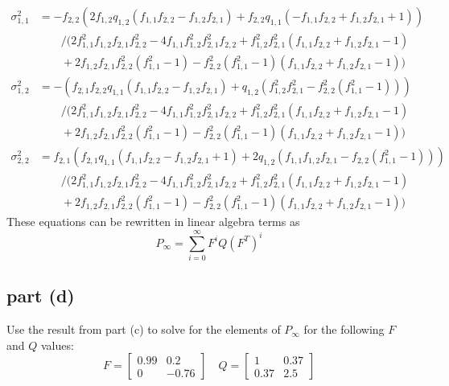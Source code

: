 \documentclass[11pt]{article}
\begin{document}
\begin{align*}
	\sigma_{1,1}^2 &= -f_{2,2}(2f_{1,2}q_{1,2}(f_{1,1}f_{2,2} - f_{1,2}f_{2,1}) + f_{2,2}q_{1,1}(-f_{1,1}f_{2,2} + f_{1,2}f_{2,1} + 1)) \\
	&\qquad /(2f_{1,1}^2f_{1,2}f_{2,1}f_{2,2}^2 - 4f_{1,1}f_{1,2}^2f_{2,1}^2f_{2,2} + f_{1,2}^2f_{2,1}^2(f_{1,1}f_{2,2} + f_{1,2}f_{2,1} - 1) \\
	&\qquad + 2f_{1,2}f_{2,1}f_{2,2}^2(f_{1,1}^2 - 1) - f_{2,2}^2(f_{1,1}^2 - 1)(f_{1,1}f_{2,2} + f_{1,2}f_{2,1} - 1)) \\
	\sigma_{1,2}^2 &= -(f_{2,1}f_{2,2}q_{1,1}(f_{1,1}f_{2,2} - f_{1,2}f_{2,1}) + q_{1,2}(f_{1,2}^2f_{2,1}^2 - f_{2,2}^2(f_{1,1}^2 - 1))) \\
	&\qquad /(2f_{1,1}^2f_{1,2}f_{2,1}f_{2,2}^2 - 4f_{1,1}f_{1,2}^2f_{2,1}^2f_{2,2} + f_{1,2}^2f_{2,1}^2(f_{1,1}f_{2,2} + f_{1,2}f_{2,1} - 1) \\
	&\qquad+ 2f_{1,2}f_{2,1}f_{2,2}^2(f_{1,1}^2 - 1) - f_{2,2}^2(f_{1,1}^2 - 1)(f_{1,1}f_{2,2} + f_{1,2}f_{2,1} - 1)) \\
	\sigma_{2,2}^2 &= f_{2,1}(f_{2,1}q_{1,1}(f_{1,1}f_{2,2} - f_{1,2}f_{2,1} + 1) + 2q_{1,2}(f_{1,1}f_{1,2}f_{2,1} - f_{2,2}(f_{1,1}^2 - 1))) \\
	&\qquad /(2f_{1,1}^2f_{1,2}f_{2,1}f_{2,2}^2 - 4f_{1,1}f_{1,2}^2f_{2,1}^2f_{2,2} + f_{1,2}^2f_{2,1}^2(f_{1,1}f_{2,2} + f_{1,2}f_{2,1} - 1) \\
	&\qquad+ 2f_{1,2}f_{2,1}f_{2,2}^2(f_{1,1}^2 - 1) - f_{2,2}^2(f_{1,1}^2 - 1)(f_{1,1}f_{2,2} + f_{1,2}f_{2,1} - 1))
\end{align*}
These equations can be rewritten in linear algebra terms as
\begin{equation*}
	P_\infty = \sum_{i=0}^\infty F^iQ(F^T)^i
\end{equation*}

\subsection*{part (d)}
Use the result from part (c) to solve for the elements of $P_\infty$ for the following $F$ and $Q$ values:
\begin{equation*}
	F=\begin{bmatrix} 0.99&0.2\\0&-0.76 \end{bmatrix}\quad Q=\begin{bmatrix} 1&0.37\\0.37&2.5 \end{bmatrix}
\end{equation*}
\end{document}
